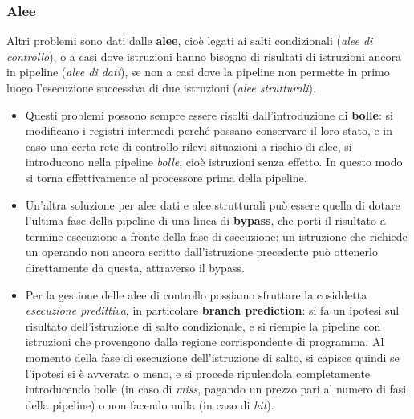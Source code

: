 \documentclass[a4paper,11pt]{article}
\begin{document}
\subsubsection{Alee}

Altri problemi sono dati dalle \textbf{alee}, cioè legati ai salti condizionali (\textit{alee di controllo}), o a casi dove istruzioni hanno bisogno di risultati di istruzioni ancora in pipeline (\textit{alee di dati}), se non a casi dove la pipeline non permette in primo luogo l'esecuzione successiva di due istruzioni (\textit{alee strutturali}).

\begin{itemize}
	\item 
		Questi problemi possono sempre essere risolti dall'introduzione di \textbf{bolle}: si modificano i registri intermedi perché possano conservare il loro stato, e in caso una certa rete di controllo rilevi situazioni a rischio di alee, si introducono nella pipeline \textit{bolle}, cioè istruzioni senza effetto.
		In questo modo si torna effettivamente al processore prima della pipeline.

	\item 
		Un'altra soluzione per alee dati e alee strutturali può essere quella di dotare l'ultima fase della pipeline di una linea di \textbf{bypass}, che porti il risultato a termine esecuzione a fronte della fase di esecuzione: un istruzione che richiede un operando non ancora scritto dall'istruzione precedente può ottenerlo direttamente da questa, attraverso il bypass.

	\item 
		Per la gestione delle alee di controllo possiamo sfruttare la cosiddetta \textit{esecuzione predittiva}, in particolare \textbf{branch prediction}: si fa un ipotesi sul risultato dell'istruzione di salto condizionale, e si riempie la pipeline con istruzioni che provengono dalla regione corrispondente di programma.
		Al momento della fase di esecuzione dell'istruzione di salto, si capisce quindi se l'ipotesi si è avverata o meno, e si procede ripulendola completamente introducendo bolle (in caso di \textit{miss}, pagando un prezzo pari al numero di fasi della pipeline) o non facendo nulla (in caso di \textit{hit}).


\end{itemize}
\end{document}
